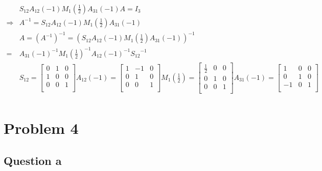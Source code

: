\documentclass{article}
\begin{document}
~

\begin{equation*}
\begin{split}
&S_{12}A_{12}(-1)M_{1}(\frac{1}{2})A_{31}(-1)A=I_{3}\\
\Rightarrow&A^{-1}=S_{12}A_{12}(-1)M_{1}(\frac{1}{2})A_{31}(-1)\\
&A=(A^{-1})^{-1}=(S_{12}A_{12}(-1)M_{1}(\frac{1}{2})A_{31}(-1))^{-1}\\
=&A_{31}(-1)^{-1}M_{1}(\frac{1}{2})^{-1}A_{12}(-1)^{-1}{S_{12}}^{-1}\\
&S_{12}=\begin{bmatrix}
0&1&0\\
1&0&0\\
0&0&1\\
\end{bmatrix} A_{12}(-1)=\begin{bmatrix}
1&-1&0\\
0&1&0\\
0&0&1\\
\end{bmatrix} M_{1}(\frac{1}{2})=\begin{bmatrix}
\frac{1}{2}&0&0\\
0&1&0\\
0&0&1\\
\end{bmatrix} A_{31}(-1)=\begin{bmatrix}
1&0&0\\
0&1&0\\
-1&0&1\\
\end{bmatrix}\\
\end{split}
\end{equation*}

\newpage

\section{Problem 4}

\subsection{Question a}

~
\end{document}
